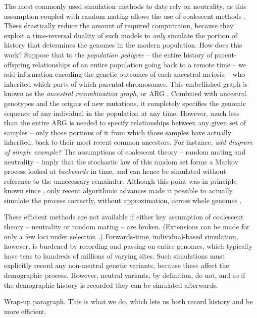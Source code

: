 \documentclass{bioinfo}
\newcommand{\plr}[1]{{\color{blue}\it #1}}
\begin{document}
The most commonly used simulation methods to date rely on neutrality,
as this assumption coupled with random mating allows the use of coalescent methods \citep{wakeley}.
These drastically reduce the amount of required computation,
because they exploit a time-reversal duality of such models
to \emph{only} simulate the portion of history that determines the genomes in the modern population.
How does this work?
Suppose that to the \emph{population pedigree} --
the entire history of parent-offspring relationships of an entire population going back to a remote time --
we add information encoding the genetic outcomes of each ancestral meiosis --
who inherited which parts of which parental chromosomes.
This embellished graph is known as the \emph{ancestral recombination graph}, or ARG \citep{griffiths}.
Combined with ancestral genotypes and the origins of new mutations,
it completely specifies the genomic sequence of any individual in the population at any time.
However, much less than the entire ARG is needed to specify relationships between any given set of samples --
only those portions of it from which those samples have actually inherited, back to their most recent common ancestors.
For instance, \plr{add diagram of simple example?}
The assumptions of coalescent theory -- random mating and neutrality --
imply that the stochastic law of this random set forms a Markov process looked at \emph{backwards} in time,
and can hence be simulated without reference to the unnecessary remainder.
Although this point was in principle known since \citet{griffithsmarjoram},
only recent algorithmic advances made it possible to actually simulate the process correctly,
without approximation, across whole genomes \citep{msprime}.

These efficient methods are not available if either key assumption of coalescent theory --
neutrality or random mating -- are broken.
(Extensions can be made for only a few loci under selection \citep{hudson,krone}.)
Forwards-time, individual-based simulation, however, is burdened by recording and passing on entire genomes,
which typically have tens to hundreds of millions of varying sites.
Such simulations must explicitly record any non-neutral genetic variants,
because these affect the demographic process.
However, neutral variants, by definition, do not, 
and so if the demographic history is recorded
they can be simulated afterwards.

Wrap-up paragraph.  
This is what we do, which lets us both record history
and be more efficient.
\end{document}
